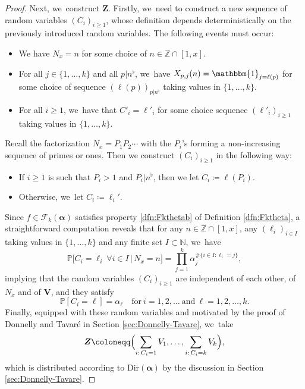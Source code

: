 \documentclass[10pt]{amsart}
\newcommand{\bV}{{\boldsymbol V}}
\newcommand{\bZ}{{\boldsymbol Z}}
\newcommand{\NN}{\mathbb{N}}
\newcommand{\ZZ}{\mathbb{Z}}
\newcommand{\PP}{\mathbb{P}}
\newcommand{\boldalpha}{\boldsymbol{\alpha}}
\newcommand{\one}{\mathbbm{1}}
\newcommand{\bg}{\big}
\theoremstyle{plain}
\theoremstyle{definition}
\begin{document}
\begin{proof}
Next, we~construct $\bZ$. Firstly, we~need to construct a new sequence of random variables $(C_i)_{i\ge1}$, whose definition depends deterministically on the previously introduced random variables. The following events must occur:
\begin{itemize}
\item We have $N_x = n$ for some choice of $n \in \ZZ \cap [1, x]$.
\item For all $j \in \{1, \ldots, k\}$ and all $p|n^\flat$, we~have $X_{p, j}(n) = \one_{j=\ell(p)}$ for some choice of sequence $(\ell(p))_{p | n^\flat}$ taking values in $\{1, \ldots, k\}$.
\item For all $i \ge 1$, we~have that $C'_i = \ell'_i$ for some choice sequence $(\ell'_i)_{i \ge 1}$ taking values in $\{1, \ldots, k\}$.
\end{itemize}
Recall the factorization $N_x=P_1P_2\cdots$ with the $P_i$'s forming a non-increasing sequence of primes or ones. Then we construct $(C_i)_{i \ge 1}$ in the following way:
\begin{itemize}
\item If $i\ge1$ is such that $P_i > 1$ and $P_i|n^\flat$, then we let $C_i\coloneqq\ell(P_i)$.
\item Otherwise, we~let $C_i\coloneqq \ell_i'$.
\end{itemize}
Since $f\in\mathcal F_k(\boldalpha)$ satisfies property \eqref{dfn:Fkthetab} of Definition \ref{dfn:Fktheta}, a straightforward computation reveals that for any $n \in \ZZ \cap [1, x]$, any $(\ell_i)_{i \in I}$ taking values in $\{1, \ldots, k\}$ and any finite set $I \subset \NN$, we~have
\[
\PP\bg[C_i = \ell_i \ \forall i \in I\, |\,N_x = n\bg] = \prod_{j=1}^k \alpha_j^{\#\{i \in I : \ell_i = j\}},
\]
implying that the random variables $(C_i)_{i\ge1}$ are independent of each other, of $N_x$ and of $\bV$, and they satisfy
\[
\label{eq:C_i dfn}
\PP[C_i=\ell]=\alpha_\ell\quad\text{for}\ i=1,2,\dots\ \text{and}\ \ell=1,2,\dots,k.
\]
Finally, equipped with these random variables and motivated by the proof of Donnelly and Tavaré in Section \ref{sec:Donnelly-Tavare}, we~take
\[
\bZ \coloneqq \Bigl(\sum_{i:\, C_i=1} V_1, \ldots, \sum_{i:\, C_i=k} V_k \Bigr),
\]
which is distributed according to $\text{Dir}(\boldalpha)$ by the discussion in Section \ref{sec:Donnelly-Tavare}.


\end{proof}
\end{document}
